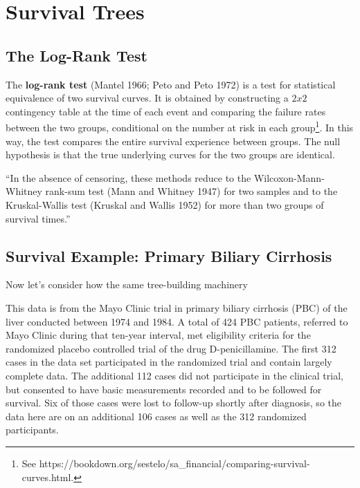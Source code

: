 \chapter{Survival Trees}



\section{The Log-Rank Test}

The \textbf{log-rank test} (Mantel 1966; Peto and Peto 1972) is a test for statistical equivalence of two survival curves. It is obtained by constructing a $2x2$ contingency table at the time of each event and comparing the failure rates between the two groups, conditional on the number at risk in each group\footnote{See https://bookdown.org/sestelo/sa\_financial/comparing-survival-curves.html.}. In this way, the test compares the entire survival experience between groups. The null hypothesis is that the true underlying curves for the two groups are identical.

``In the absence of censoring, these methods reduce to the Wilcoxon-Mann-Whitney rank-sum test (Mann and Whitney 1947) for two samples and to the Kruskal-Wallis test (Kruskal and Wallis 1952) for more than two groups of survival times.''




\section{Survival Example: Primary Biliary Cirrhosis}

Now let's consider how the same tree-building machinery 

This data is from the Mayo Clinic trial in primary biliary cirrhosis (PBC) of the liver conducted between 1974 and 1984. A total of 424 PBC patients, referred to Mayo Clinic during that ten-year interval, met eligibility criteria for the randomized placebo controlled trial of the drug D-penicillamine. The first 312 cases in the data set participated in the randomized trial and contain largely complete data. The additional 112 cases did not participate in the clinical trial, but consented to have basic measurements recorded and to be followed for survival. Six of those cases were lost to follow-up shortly after diagnosis, so the data here are on an additional 106 cases as well as the 312 randomized participants.



